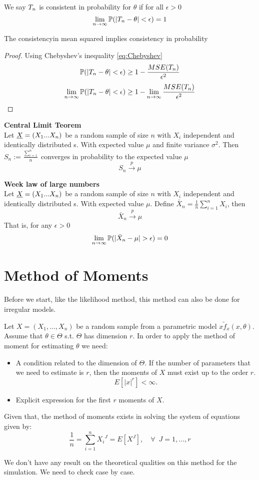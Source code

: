 \begin{defi}
	We say $T_{n}$ is consistent in probability for $\theta$ if for all $\epsilon >0$
	$$\lim_{n\to \infty}\mathbb{P}(|T_{n}-\theta|<\epsilon)=1$$
\end{defi}
\begin{prop}
	The  consistencyin mean squared implies consistency in probability 
\end{prop}
\begin{proof}
	Using Chebyshev's inequality \ref{eq:Chebyshev}
	$$\mathbb{P}(|T_{n}-\theta|<\epsilon)\geq 1-\frac{MSE(T_{n})}{\epsilon^2}$$
	$$\lim_{n\to \infty}\mathbb{P}(|T_{n}-\theta|<\epsilon)\geq 1-\lim_{n\to \infty}\frac{MSE(T_{n})}{\epsilon^2}$$
\end{proof}
\begin{teo}
	\textbf{Central Limit Teorem}\\
	Let $\underline X=(X_1... X_n)$ be a random sample of size $n$ with $X_i$ independent and identically distributed \rv s. With  expected value $\mu$ and finite variance $\sigma^2$. Then $S_n:=\frac{\sum_{i=1}^n}{n}$ converges in probability to the expected value $\mu$
	$$S_n\xrightarrow{p} \mu$$
\end{teo}

\begin{teo}
	\textbf{Week law of large numbers}\\
	Let $\underline X=(X_1... X_n)$ be a random sample of size $n$ with $X_i$ independent and identically distributed \rv s. With  expected value $\mu$.
	Define $\bar X_n=\frac{1}{n}\sum_{i=1}^{n}X_i$, then
	$$\bar X_n \xrightarrow{p} \mu$$
	That is, for any $\epsilon>0$
	$$\lim_{n\to \infty}\p(|\bar X_n- \mu|>\epsilon)=0$$
\end{teo}


	\section{Method of Moments}

\begin{oss}
	Before we start, like the likelihood method, this method can also be done for irregular models.
\end{oss}


Let $X=(X_1,\ldots,X_n)$ be a random sample from a parametric model $x\tilde f_x(x,\theta)$.
Assume that $\theta\in\Theta$ s.t. $\Theta$ has dimension $r$. In order to apply the method of moment for estimating $\theta$ we need: 
\begin{itemize}
	\item
	A condition related to the dimension of $\Theta$. If the number of parameters that we need to estimate is $r$, then the moments of $X$ must exist up to the order $r$.
	$$E[{|x|}^r]<\infty.$$
	\item
	Explicit expression for the first $r$ moments of $X$.
\end{itemize}
Given that, the method of moments exists in solving the system of equations given by:
$$\frac{1}{n}=\sum_{i=1}^{n}{X_i}^{J}=E[X^{J}], \quad \forall\enspace J=1,\ldots,r$$
\begin{oss}
	We don't have any result on the theoretical qualities on this method for the simulation. We need to check case by case.
\end{oss}

